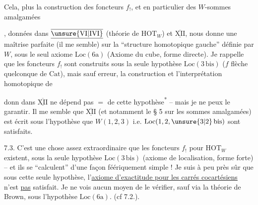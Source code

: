 Cela, plus la construction des foncteurs $f_!$, et en particulier des $W$-sommes amalgamées


, données dans $\underline{\overline{\unsure{\mathrm{VI}|\mathrm{IVI}}}}$ (théorie de $\mathrm{HOT}_W$) et $\underline{\overline{\mathrm{XII}}}$, nous donne une maîtrise parfaite (il me semble) sur la ``structure homotopique gauche'' définie par $W$, sous le seul axiome $\mathrm{Loc}(6\mathrm{a})$ (Axiome du cube, forme directe). Je rappelle que les foncteurs $f_!$ sont construits  sous la seule hypothèse \uline{$\mathrm{Loc}(3\,\mathrm{bis})$} ($f$ flèche quelconque de $\mathrm{Cat}$), mais sauf erreur,  la construction
et l'interprétation homotopique de


donn dans $\underline{\overline{\mathrm{XII}}}$ ne dépend pas $=$ de cette hypothèse\textsuperscript{*}%
 -- mais je ne peux le garantir. Il me semble que $\underline{\overline{\mathrm{XII}}}$ (et notamment le  § 5 sur les sommes amalgamées) est écrit sous l'hypothèse que $W(1,2,3)$ i.e. $\mathrm{Loc}(1,2,\unsure{3|2}\,\mathrm{bis})$ sont satisfaits.

7.3. C'est une chose assez extraordinaire que les foncteurs $f_!$ pour $\mathrm{HOT}_W$ existent, sous la seule hypothèse \uline{$\mathrm{Loc}(3\,\mathrm{bis})$} (axiome de localisation, forme forte) -- et ils se ``calculent'' d'une façon féériquement simple !%
 Je suis à peu près sûr que sous cette seule hypothèse, l'\uline{axiome d'exactitude pour les carrés cocartésiens} n'est \uline{pas} satisfait. Je ne vois aucun moyen de le vérifier, sauf via la théorie de Brown, sous l'hypothèse \uline{$\mathrm{Loc}(6\mathrm{a})$}. (cf 7.2.).

